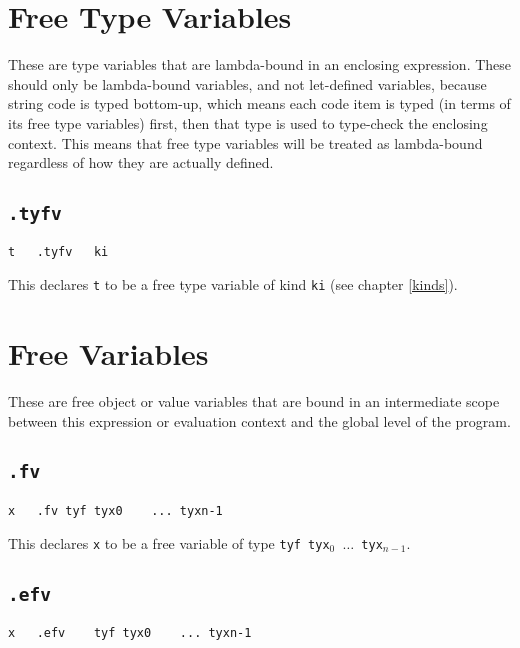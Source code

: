 \documentclass{report}
\newcommand\stringcode[1]{\texttt{#1}}
\begin{document}
\section{Free Type Variables}
\label{type_fv}

These are type variables that are lambda-bound in an enclosing expression.
These should only be lambda-bound variables, and not let-defined variables, because string code is typed bottom-up,
which means each code item is typed (in terms of its free type variables) first, then that type is used to type-check the enclosing context.
This means that free type variables will be treated as lambda-bound regardless of how they are actually defined.

\subsection{\stringcode{.tyfv}}

\begin{verbatim}
t	.tyfv	ki
\end{verbatim}

This declares \stringcode{t} to be a free type variable of kind \stringcode{ki} (see chapter \ref{kinds}).

\section{Free Variables}
\label{value_fv}

These are free object or value variables that are bound in an intermediate scope between this expression or evaluation context and the global level of the program.

\subsection{\stringcode{.fv}}

\begin{verbatim}
x	.fv	tyf	tyx0	...	tyxn-1
\end{verbatim}

This declares \stringcode{x} to be a free variable of type \stringcode{tyf tyx$_0$ $\ldots$ tyx$_{n-1}$}.

\subsection{\stringcode{.efv}}

\begin{verbatim}
x	.efv	tyf	tyx0	...	tyxn-1
\end{verbatim}
\end{document}
